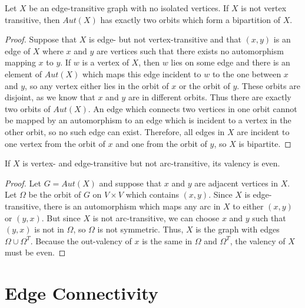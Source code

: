 \begin{lemma}
Let $X$ be an edge-transitive graph with no isolated vertices.  If $X$ is not vertex transitive, then $Aut(X)$ has exactly two orbits which form a bipartition of $X$.
\end{lemma}
\begin{proof}
Suppose that $X$ is edge- but not vertex-transitive and that $(x,y)$ is an edge of $X$ where $x$ and $y$ are vertices such that there exists no automorphism mapping $x$ to $y$.  If $w$ is a vertex of $X$, then $w$ lies on some edge and there is an element of $Aut(X)$ which maps this edge incident to $w$ to the one between $x$ and $y$, so any vertex either lies in the orbit of $x$ or the orbit of $y$.  These orbits are disjoint, as we know that $x$ and $y$ are in different orbits.  Thus there are exactly two orbits of $Aut(X)$.  An edge which connects two vertices in one orbit cannot be mapped by an automorphism to an edge which is incident to a vertex in the other orbit, so no such edge can exist.  Therefore, all edges in $X$ are incident to one vertex from the orbit of $x$ and one from the orbit of $y$, so $X$ is bipartite.


\end{proof}

\begin{lemma}
If $X$ is vertex- and edge-transitive but not arc-transitive, its valency is even.
\end{lemma}

\begin{proof}
Let $G=Aut(X)$ and suppose that $x$ and $y$ are adjacent vertices in $X$.  Let $\Omega$ be the orbit of $G$ on $V\times V$ which contains $(x,y)$.  Since $X$ is edge-transitive, there is an automorphism which maps any arc in $X$ to either $(x,y)$ or $(y,x)$. But since $X$ is not arc-transitive, we can choose $x$ and $y$ such that  $(y,x)$ is not in $\Omega$, so $\Omega$ is not symmetric.  Thus, $X$ is the graph with edges $\Omega\cup\Omega^T$.  Because the out-valency of $x$ is the same in $\Omega$ and $\Omega^T$, the valency of $X$ must be even.
\end{proof}



\section*{Edge Connectivity}


